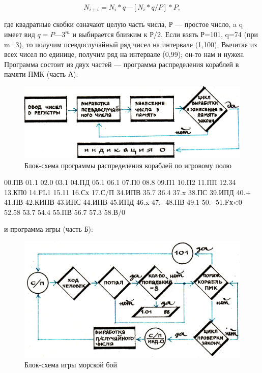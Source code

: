 \documentclass[11pt,a4paper,oneside]{article}
\begin{document}
\begin{equation}
N_{i+i} =N_{i}*q—[N_{i}*q/P]*P,
\end{equation}

где квадратные скобки означают целую часть числа, Р — простое число, a q имеет вид $q=P—3^{m}$ и выбирается близким к Р/2. Если взять Р=101, q=74 (при m=3), то получим псевдослучайный ряд чисел на интервале (1,100). Вычитая из всех чисел по единице, получим ряд на интервале (0,99); он-то нам и нужен. Программа состоит из двух частей — программа распределения кораблей в памяти ПМК (часть А):

\begin{figure}[H]
\includegraphics[width=\textwidth]{sea1}
\caption{Блок-схема программы распределения кораблей по игровому полю}
\end{figure}

00.ПВ 01.1 02.0 03.1 04.ПД 05.1 06.1 07.П0 08.8 09.П1 10.П2 11.ПП
12.34 13.КП0 14.FL1 15.11 16.Сх 17.С/П
34.ИПВ 35.7 36.4 37.x 38.ПС 39.ИПД 40.$\div$ 41.ПВ 42.КИПВ 43.ИПС 44.ИПВ 45.ИПД 46.x 47.- 48.ПВ 49.1 50.- 51.Fх<0 52.58 53.7 54.4 55.ПВ 56.7 57.3 58.В/0

и программа игры (часть Б):

\begin{figure}[H]
\includegraphics[width=\textwidth]{sea2}
\caption{Блок-схема игры морской бой}
\end{figure}
\end{document}
